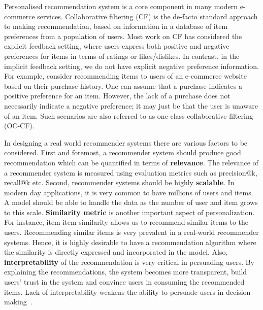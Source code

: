 Personalised recommendation system is a core component
in many modern e-commerce services. Collaborative
filtering (CF) is the de-facto standard approach to making recommendation,
based on information in a database
of item preferences from a population of users. Most work on CF has considered 
the explicit feedback
setting, where users express both positive and negative preferences
for items in terms of ratings or likes/dislikes. In
contrast, in the implicit feedback setting, we do not have
explicit negative preference information. For example, consider
recommending items to users of an e-commerce website
based on their purchase history. One can assume that a
purchase indicates a positive preference for an item. However,
the lack of a purchase does not necessarily indicate
a negative preference; it may just be that the user is unaware
of an item. Such scenarios are also referred to as one-class collaborative
filtering (OC-CF).



In designing a real world recommender systems there are various factors to be 
considered. First and foremost, a recommender system should  produce good recommendation which can be quantified in terms of \textbf{relevance}. The relevance of a recommender system is measured using evaluation metrics such as \textsf{precision@k}, \textsf{recall@k} etc. Second, recommender systems should be highly \textbf{scalable}. In modern day applications, it is very common to have millions of users and items. A model should be able to handle the data as the number of user and item grows to this scale. \textbf{Similarity metric} is another important aspect of personalization. For instance, item-item similarity allows us to recommend similar items to the users. Recommending similar items is very prevalent in a real-world recommender systems. Hence, it is highly desirable to have a recommendation algorithm where the similarity is directly expressed and incorporated in the model. Also, \textbf{interpretability} of the recommendation is very critical in persuading users. By explaining the recommendations, the system becomes more transparent, build users' trust in the system and convince users in consuming the recommended items. Lack of interpretability weakens the ability to persuade users in decision making~\citep{explainabiltyVIG2009}.

